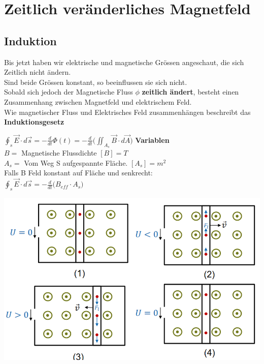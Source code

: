 




\newpage

\section{Zeitlich veränderliches Magnetfeld}

\subsection{Induktion}

Bis jetzt haben wir elektrische und magnetische Grössen angeschaut, die sich Zeitlich nicht ändern. \\
Sind beide Grössen konstant, so beeinflussen sie sich nicht. \\
Sobald sich jedoch der Magnetische Fluss $\phi$  \textbf{zeitlich ändert}, besteht einen Zusammenhang zwischen Magnetfeld und elektrischem Feld. \\
Wie magnetischer Fluss und Elektrisches Feld zusammenhängen beschreibt das \textbf{Induktionsgesetz}


\begingl
\formulaBegin
  $\displaystyle \oint_s \vec{E}\cdot d\vec{s} = -\frac{d}{dt}\Phi(t) =  -\frac{d}{dt} \big ( \iint_{A_s} \vec{B} \cdot d\vec{A} \big )$
\formulaEnd
\textbf{Variablen} \\
$B = $ Magnetische Flussdichte $[B] = T$\\
$A_s = $ Vom Weg S aufgespannte Fläche. $[A_s] = m^2$ \\

Falls B Feld konstant auf Fläche und senkrecht: \\

\formulaBegin
  $\displaystyle  \oint_s \vec{E}\cdot d\vec{s} = -\frac{d}{dt} \big ( B_{eff} \cdot A_s \big ) $
\formulaEnd
\iend
\begin{center}
  \includegraphics[scale=0.6]{img/beweg-ind}
\end{center}
\beginip
\iend

